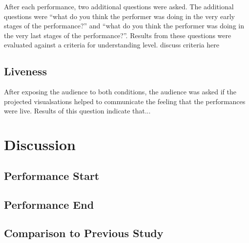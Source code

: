 After each performance, two additional questions were asked. The additional questions were ``what do you think the performer was doing in the very early stages of the performance?'' and ``what do you think the performer was doing in the very last stages of the performance?''. Results from these questions were evaluated against a criteria for understanding level. {\color{red} discuss criteria here}


\subsection{Liveness}

After exposing the audience to both conditions, the audience was asked if the projected visualsations helped to communicate the feeling that the performances were live. Results of this question indicate that...

\more

\section{Discussion}



\subsection{Performance Start}


\subsection{Performance End}


\subsection{Comparison to Previous Study}

